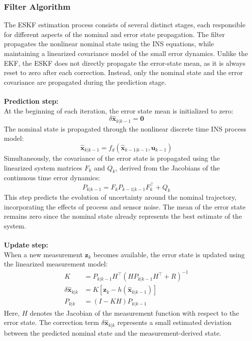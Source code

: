 \subsubsection{Filter Algorithm}
The ESKF estimation process consists of several distinct stages, each responsible for different aspects of the nominal and error state propagation. The filter propagates the nonlinear nominal state using the INS equations, while maintaining a linearized covariance model of the small error dynamics. Unlike the EKF, the ESKF does not directly propagate the error-state mean, as it is always reset to zero after each correction. Instead, only the nominal state and the error covariance are propagated during the prediction stage.
\\ \\
\textbf{Prediction step:} \\ \noindent
At the beginning of each iteration, the error state mean is initialized to zero:
$$
    \delta\hat{\mathbf{x}}_{k|k-1} = \mathbf{0}
$$
The nominal state is propagated through the nonlinear discrete time INS process model:
$$
    \hat{\mathbf{x}}_{k|k-1} = f_d(\hat{\mathbf{x}}_{k-1|k-1}, \mathbf{u}_{k-1})
$$
Simultaneously, the covariance of the error state is propagated using the linearized system matrices $F_k$ and $Q_k$, derived from the Jacobians of the continuous time error dynamics:
$$
    P_{k|k-1} = F_k P_{k-1|k-1} F_k^\top + Q_k
$$
This step predicts the evolution of uncertainty around the nominal trajectory, incorporating the effects of process and sensor noise. The mean of the error state remains zero since the nominal state already represents the best estimate of the system.
\\ \\
\textbf{Update step:} \\ \noindent
When a new measurement $\mathbf{z}_k$ becomes available, the error state is updated using the linearized measurement model:
$$
\begin{aligned}
    K &= P_{k|k-1} H^\top (H P_{k|k-1} H^\top + R)^{-1} \\
    \delta\hat{\mathbf{x}}_{k|k} &= K [\mathbf{z}_k - h(\hat{\mathbf{x}}_{k|k-1})] \\
    P_{k|k} &= (I - K H) P_{k|k-1}
\end{aligned}
$$
Here, $H$ denotes the Jacobian of the measurement function with respect to the error state. The correction term $\delta\hat{\mathbf{x}}_{k|k}$ represents a small estimated deviation between the predicted nominal state and the measurement-derived state.
\\ \\
